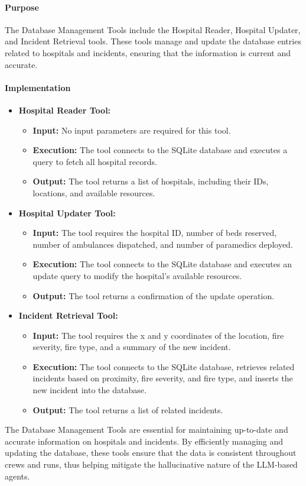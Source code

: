 \paragraph{Purpose}
The Database Management Tools include the Hospital Reader, Hospital Updater, and Incident Retrieval tools. These tools manage and update the database entries related to hospitals and incidents, ensuring that the information is current and accurate.

\paragraph{Implementation}
\begin{itemize}
    \item \textbf{Hospital Reader Tool:}
        \begin{itemize}
            \item \textbf{Input:} No input parameters are required for this tool.
            \item \textbf{Execution:} The tool connects to the SQLite database and executes a query to fetch all hospital records.
            \item \textbf{Output:} The tool returns a list of hospitals, including their IDs, locations, and available resources.
        \end{itemize}
    \item \textbf{Hospital Updater Tool:}
        \begin{itemize}
            \item \textbf{Input:} The tool requires the hospital ID, number of beds reserved, number of ambulances dispatched, and number of paramedics deployed.
            \item \textbf{Execution:} The tool connects to the SQLite database and executes an update query to modify the hospital's available resources.
            \item \textbf{Output:} The tool returns a confirmation of the update operation.
        \end{itemize}
    \item \textbf{Incident Retrieval Tool:}
        \begin{itemize}
            \item \textbf{Input:} The tool requires the x and y coordinates of the location, fire severity, fire type, and a summary of the new incident.
            \item \textbf{Execution:} The tool connects to the SQLite database, retrieves related incidents based on proximity, fire severity, and fire type, and inserts the new incident into the database.
            \item \textbf{Output:} The tool returns a list of related incidents.
        \end{itemize}
\end{itemize}

The Database Management Tools are essential for maintaining up-to-date and accurate information on hospitals and incidents. By efficiently managing and updating the database, these tools ensure that the data is consistent throughout crews and runs, thus helping mitigate the hallucinative nature of the LLM-based agents.